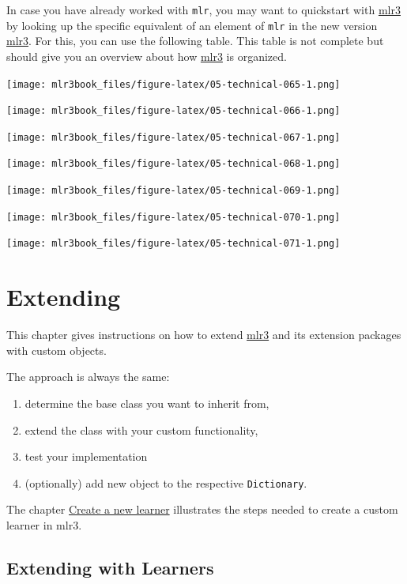 \documentclass[
  11pt,
  parskip=half,
  DIV=calc,
  BCOR=10mm,
  x11names]{scrbook}
\providecommand{\tightlist}{%
  \setlength{\itemsep}{0pt}\setlength{\parskip}{0pt}}
\begin{document}
In case you have already worked with \texttt{mlr}, you may want to quickstart with \href{https://mlr3.mlr-org.com}{mlr3} by looking up the specific equivalent of an element of \texttt{mlr} in the new version \href{https://mlr3.mlr-org.com}{mlr3}.
For this, you can use the following table.
This table is not complete but should give you an overview about how \href{https://mlr3.mlr-org.com}{mlr3} is organized.

\texttt{[image: mlr3book\_files/figure-latex/05-technical-065-1.png]}

\texttt{[image: mlr3book\_files/figure-latex/05-technical-066-1.png]}

\texttt{[image: mlr3book\_files/figure-latex/05-technical-067-1.png]}

\texttt{[image: mlr3book\_files/figure-latex/05-technical-068-1.png]}

\texttt{[image: mlr3book\_files/figure-latex/05-technical-069-1.png]}

\texttt{[image: mlr3book\_files/figure-latex/05-technical-070-1.png]}

\texttt{[image: mlr3book\_files/figure-latex/05-technical-071-1.png]}

\hypertarget{extending}{%
\chapter{Extending}\label{extending}}

This chapter gives instructions on how to extend \href{https://mlr3.mlr-org.com}{mlr3} and its extension packages with custom objects.

The approach is always the same:

\begin{enumerate}
\def\labelenumi{\arabic{enumi}.}
\tightlist
\item
  determine the base class you want to inherit from,
\item
  extend the class with your custom functionality,
\item
  test your implementation
\item
  (optionally) add new object to the respective \texttt{Dictionary}.
\end{enumerate}

The chapter \protect\hyperlink{ext-learner}{Create a new learner} illustrates the steps needed to create a custom learner in mlr3.

\hypertarget{ext-learner}{%
\section{Extending with Learners}\label{ext-learner}}
\end{document}
